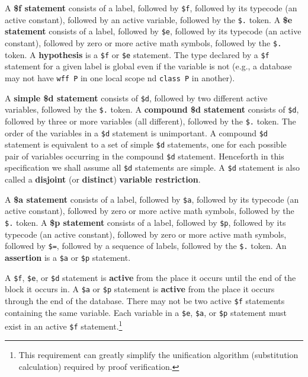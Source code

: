 A {\bf \$f statement} consists of a label,
followed by \texttt{\$f}, followed by its typecode (an active constant),
followed by an
active variable, followed by the \texttt{\$.} token.  A {\bf \$e
statement} consists of a label, followed
by \texttt{\$e}, followed by its typecode (an active constant),
followed by zero or more
active math symbols, followed by the \texttt{\$.} token.  A {\bf
hypothesis} is a \texttt{\$f} or \texttt{\$e}
statement.
The type declared by a \texttt{\$f} statement for a given label
is global even if the variable is not
(e.g., a database may not have \texttt{wff P} in one local scope
nd \texttt{class P} in another).

A {\bf simple \$d statement}
consists of \texttt{\$d}, followed by two different active variables,
followed by the \texttt{\$.} token.  A {\bf compound \$d
statement} consists of
\texttt{\$d}, followed by three or more variables (all different),
followed by the \texttt{\$.} token.  The order of the variables in a
\texttt{\$d} statement is unimportant.  A compound \texttt{\$d}
statement is equivalent to a set of simple \texttt{\$d} statements, one
for each possible pair of variables occurring in the compound
\texttt{\$d} statement.  Henceforth in this specification we shall
assume all \texttt{\$d} statements are simple.  A \texttt{\$d} statement
is also called a {\bf disjoint} (or {\bf distinct}) {\bf variable
restriction}.

A {\bf \$a statement} consists of a label,
followed by \texttt{\$a}, followed by its typecode (an active constant),
followed by
zero or more active math symbols, followed by the \texttt{\$.} token.  A {\bf
\$p statement} consists of a label,
followed by \texttt{\$p}, followed by its typecode (an active constant),
followed by
zero or more active math symbols, followed by \texttt{\$=}, followed by
a sequence of labels, followed by the \texttt{\$.} token.  An {\bf
assertion} is a \texttt{\$a} or \texttt{\$p} statement.

A \texttt{\$f}, \texttt{\$e}, or \texttt{\$d} statement is {\bf active} from the place it occurs until the end of the block it occurs in.
A \texttt{\$a} or \texttt{\$p} statement is {\bf active} from the place it occurs
through the end of the database.
There may not be two active \texttt{\$f} statements containing the same
variable.  Each variable in a \texttt{\$e}, \texttt{\$a}, or
\texttt{\$p} statement must exist in an active \texttt{\$f}
statement.\footnote{This requirement can greatly simplify the
unification algorithm (substitution calculation) required by proof
verification.}

